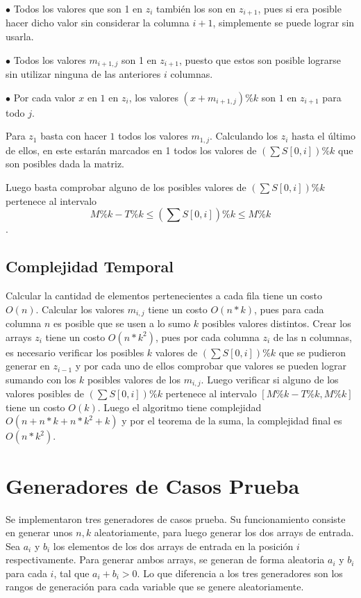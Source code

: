 \documentclass[article]{llncs}
\begin{document}
$\bullet $ Todos los valores que son 1 en $z_i$ también los son en $z_{i+1}$, pues si era posible hacer dicho valor sin considerar la columna $i+1$, simplemente se puede lograr sin usarla.

$\bullet $ Todos los valores $m_{i+1,j}$ son 1 en $z_{i+1}$, puesto que estos son posible lograrse sin utilizar ninguna de las anteriores $i$ columnas.

$\bullet $ Por cada valor $x$ en $1$ en $z_i$, los valores $(x+m_{i+1,j}) \% k$ son $1$ en $z_{i+1}$ para todo $j$.

Para $z_1$ basta con hacer $1$ todos los valores $m_{1,j}$. Calculando los $z_i$ hasta el último de ellos, en este estarán marcados en 1 todos los valores de $(\sum S[0,i])\%k$ que son posibles dada la matriz.

Luego basta comprobar alguno de los posibles valores de $(\sum S[0,i])\%k$ pertenece al intervalo $$M\%k - T\% k \leq (\sum S[0,i])\%k \leq M \% k$$.

\subsection{Complejidad Temporal}

Calcular la cantidad de elementos pertenecientes a cada fila tiene un costo $O(n)$. Calcular los valores $m_{i,j}$ tiene un costo $O(n*k)$, pues para cada columna $n$ es posible que se usen a lo sumo $k$ posibles valores distintos.
Crear los arrays $z_i$ tiene un costo $O(n*k^2)$, pues por cada columna $z_i$ de las n columnas, es necesario verificar los posibles $k$ valores
de $(\sum S[0,i])\%k$ que se pudieron generar en $z_{i-1}$ y por cada uno de ellos comprobar que valores se pueden lograr sumando con los $k$
posibles valores de los $m_{i,j}$. Luego verificar si alguno de los valores posibles de $(\sum S[0,i])\%k$ pertenece al intervalo $[M\%k - T\% k , M \% k]$ tiene un costo $O(k)$.
Luego el algoritmo 
tiene complejidad $O(n + n*k + n*k^2 + k)$ y por el teorema de la 
suma, la complejidad final es $O(n*k^2)$.

\section{Generadores de Casos Prueba}

Se implementaron tres generadores de casos prueba. Su funcionamiento 
consiste en generar unos $n,k$ aleatoriamente, para luego generar 
los dos arrays de entrada. Sea $a_i$ y $b_i$ los elementos de los dos arrays
de entrada en la posici\'on $i$ respectivamente. Para generar ambos arrays, 
se generan de forma aleatoria $a_i$ y $b_i$ para cada $i$, tal que 
$a_i + b_i > 0$.
Lo que diferencia a los tres generadores son los rangos de generaci\'on para 
cada variable que se genere aleatoriamente.
\end{document}
